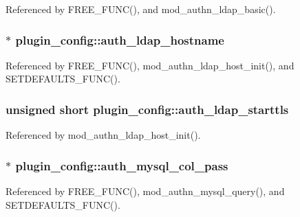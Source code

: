 Referenced by F\-R\-E\-E\-\_\-\-F\-U\-N\-C(), and mod\-\_\-authn\-\_\-ldap\-\_\-basic().

\hypertarget{structplugin__config_a5770827001932ccf2ba8568701f9cc18}{
\subsubsection[{auth\-\_\-ldap\-\_\-hostname}]{$\ast$ plugin\-\_\-config\-::auth\-\_\-ldap\-\_\-hostname}}\label{structplugin__config_a5770827001932ccf2ba8568701f9cc18}


Referenced by F\-R\-E\-E\-\_\-\-F\-U\-N\-C(), mod\-\_\-authn\-\_\-ldap\-\_\-host\-\_\-init(), and S\-E\-T\-D\-E\-F\-A\-U\-L\-T\-S\-\_\-\-F\-U\-N\-C().

\hypertarget{structplugin__config_a6ac81bd64ae70f9c242444e7ad47682a}{
\subsubsection[{auth\-\_\-ldap\-\_\-starttls}]{\setlength{\rightskip}{0pt plus 5cm}unsigned short plugin\-\_\-config\-::auth\-\_\-ldap\-\_\-starttls}}\label{structplugin__config_a6ac81bd64ae70f9c242444e7ad47682a}


Referenced by mod\-\_\-authn\-\_\-ldap\-\_\-host\-\_\-init().

\hypertarget{structplugin__config_a2e57c4744fb37470af2d8ba22a6378e7}{
\subsubsection[{auth\-\_\-mysql\-\_\-col\-\_\-pass}]{$\ast$ plugin\-\_\-config\-::auth\-\_\-mysql\-\_\-col\-\_\-pass}}\label{structplugin__config_a2e57c4744fb37470af2d8ba22a6378e7}


Referenced by F\-R\-E\-E\-\_\-\-F\-U\-N\-C(), mod\-\_\-authn\-\_\-mysql\-\_\-query(), and S\-E\-T\-D\-E\-F\-A\-U\-L\-T\-S\-\_\-\-F\-U\-N\-C().

